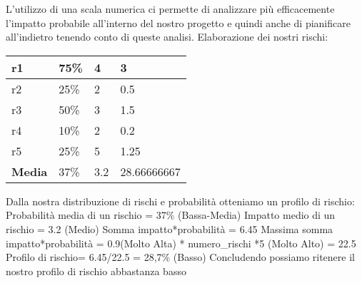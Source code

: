 	L’utilizzo di una scala numerica ci permette di analizzare più efficacemente l’impatto probabile all’interno del nostro progetto e quindi anche di pianificare all’indietro tenendo conto di queste analisi.
	Elaborazione dei nostri rischi:
	\newline \newline
	\begin{tabularx}{\textwidth}{|X|X|X|X|}
		\hline
		r1 & 75\% & 4 & 3 \\
		\hline
		r2 &  25\%  & 2  & 0.5 \\
		\hline
		r3  & 50\%  & 3  & 1.5 \\
		\hline
		r4  & 10\% &  2 &  0.2 \\
		\hline
		r5  & 25\%  & 5  & 1.25 \\
		\hline
		\textbf{Media}  & 37\% &  3.2 &  28.66666667\\
		\hline
	\end{tabularx}
	\newline \newline
	Dalla nostra distribuzione di rischi e probabilità otteniamo un profilo di rischio:
	Probabilità media di un rischio = 37\% (Bassa-Media)
	Impatto medio di un rischio = 3.2 (Medio)
	Somma impatto*probabilità = 6.45
	Massima somma impatto*probabilità = 0.9(Molto Alta) * numero\_rischi *5 (Molto Alto) = 22.5
	Profilo di rischio= 6.45/22.5 = 28,7\% (Basso)
	Concludendo possiamo ritenere il nostro profilo di rischio abbastanza basso